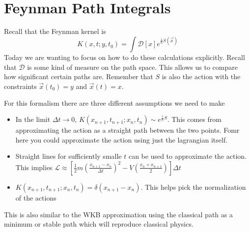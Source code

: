 \section{Feynman Path Integrals}
Recall that the Feynman kernel is
$$
    K(x, t;y, t_0) = \int \mathcal{D}\left[x\right] e^{\frac{i}{\hbar} S(\vec{x})}
$$
Today we are wanting to focus on how to do these calculations explicitly. Recall
that $\mathcal{D}$ is some kind of measure on the path space. This allows us to
compare how significant certain paths are. Remember that $S$ is also the 
action with the constraints $\vec{x}(t_0) = y$ and $\vec{x}(t) = x$.

For this formalism there are three different assumptions we need to make
\begin{itemize}
    \item In the limit $\Delta t \to 0$, $K(x_{n+1}, t_{n+1}; x_n, t_n) 
        \sim e^{\frac{i}{\hbar} S}$.
        This comes from approximating the action as a straight path between the two points.
        Fomr here you could approximate the action using just the lagrangian itself.
    \item Straight lines for sufficiently smalle $t$ can be used to approximate the action.
        This implies $\mathcal{L} \approx \left[
            \frac{1}{2} m \left(\frac{x_{n+1} - x_n}{\Delta t}\right)^2 -
            V \left(\frac{x_n + x_{n+1}}{2}\right)
        \right] \Delta t$
    \item $K(x_{n+1}, t_{n+1}; x_n, t_n) = \delta (x_{n+1} - x_n)$. This helps pick the
        normalization of the actions
\end{itemize}
This is also similar to the WKB approximation using the classical path as a minimum or
stable path which will reproduce classical physics.

